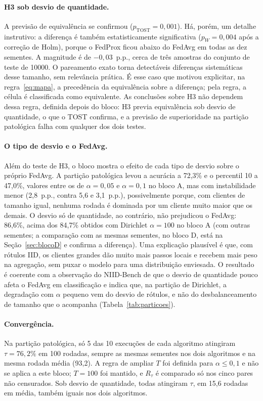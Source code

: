 \paragraph{H3 sob desvio de quantidade.} A previsão de equivalência se confirmou ($p_{\text{TOST}} = 0{,}001$). Há, porém, um detalhe instrutivo: a diferença é também estatisticamente significativa ($p_W = 0{,}004$ após a correção de Holm), porque o FedProx ficou abaixo do FedAvg em todas as dez sementes. A magnitude é de $-0{,}03$~p.p., cerca de três amostras do conjunto de teste de \num{10000}. O pareamento exato torna detectáveis diferenças sistemáticas desse tamanho, sem relevância prática. É esse caso que motivou explicitar, na regra~\eqref{eq:mapa}, a precedência da equivalência sobre a diferença; pela regra, a célula é classificada como equivalente. As conclusões sobre H3 não dependem dessa regra, definida depois do bloco: H3 previa equivalência sob desvio de quantidade, o que o TOST confirma, e a previsão de superioridade na partição patológica falha com qualquer dos dois testes.

\paragraph{O tipo de desvio e o FedAvg.} Além do teste de H3, o bloco mostra o efeito de cada tipo de desvio sobre o próprio FedAvg. A partição patológica levou a acurácia a 72,3\% e o percentil 10 a 47,0\%, valores entre os de $\alpha = 0{,}05$ e $\alpha = 0{,}1$ no bloco A, mas com instabilidade menor (2,8~p.p., contra 5,6 e 3,1~p.p.), possivelmente porque, com clientes de tamanho igual, nenhuma rodada é dominada por um cliente muito maior que os demais. O desvio só de quantidade, ao contrário, não prejudicou o FedAvg: 86,6\%, acima dos 84,7\% obtidos com Dirichlet $\alpha = 100$ no bloco A (com outras sementes; a comparação com as mesmas sementes, no bloco D, está na Seção~\ref{sec:blocoD} e confirma a diferença). Uma explicação plausível é que, com rótulos IID, os clientes grandes dão muito mais passos locais e recebem mais peso na agregação, sem puxar o modelo para uma distribuição enviesada. O resultado é coerente com a observação do NIID-Bench de que o desvio de quantidade pouco afeta o FedAvg em classificação \citep{li2022niidbench} e indica que, na partição de Dirichlet, a degradação com $\alpha$ pequeno vem do desvio de rótulos, e não do desbalanceamento de tamanho que o acompanha (Tabela~\ref{tab:particoes}).

\paragraph{Convergência.} Na partição patológica, só 5 das 10 execuções de cada algoritmo atingiram $\tau = 76{,}2\%$ em 100 rodadas, sempre as mesmas sementes nos dois algoritmos e na mesma rodada média (93,2). A regra de ampliar $T$ foi definida para $\alpha \leq 0{,}1$ e não se aplica a este bloco; $T = 100$ foi mantido, e $R_\tau$ é comparado só nos cinco pares não censurados. Sob desvio de quantidade, todas atingiram $\tau$, em 15,6 rodadas em média, também iguais nos dois algoritmos.

